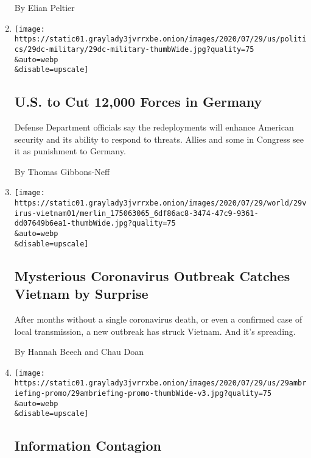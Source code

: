 \begin{enumerate}
  By Elian Peltier
\item
  \href{/2020/07/29/world/europe/us-troops-nato-germany.html}{}

  \texttt{[image: https://static01.graylady3jvrrxbe.onion/images/2020/07/29/us/politics/29dc-military/29dc-military-thumbWide.jpg?quality=75\\\&auto=webp\\\&disable=upscale]}

  \hypertarget{us-to-cut-12000-forces-in-germany}{%
  \subsection{U.S. to Cut 12,000 Forces in
  Germany}\label{us-to-cut-12000-forces-in-germany}}

  Defense Department officials say the redeployments will enhance
  American security and its ability to respond to threats. Allies and
  some in Congress see it as punishment to Germany.

  By Thomas Gibbons-Neff
\item
  \href{/2020/07/29/world/asia/coronavirus-vietnam.html}{}

  \texttt{[image: https://static01.graylady3jvrrxbe.onion/images/2020/07/29/world/29virus-vietnam01/merlin\_175063065\_6df86ac8-3474-47c9-9361-dd07649b6ea1-thumbWide.jpg?quality=75\\\&auto=webp\\\&disable=upscale]}

  \hypertarget{mysterious-coronavirus-outbreak-catches-vietnam-by-surprise}{%
  \subsection{Mysterious Coronavirus Outbreak Catches Vietnam by
  Surprise}\label{mysterious-coronavirus-outbreak-catches-vietnam-by-surprise}}

  After months without a single coronavirus death, or even a confirmed
  case of local transmission, a new outbreak has struck Vietnam. And
  it's spreading.

  By Hannah Beech and Chau Doan
\item
  \href{/2020/07/29/briefing/coronavirus-william-barr-emmy-nominations-your-wednesday-briefing.html}{}

  \texttt{[image: https://static01.graylady3jvrrxbe.onion/images/2020/07/29/us/29ambriefing-promo/29ambriefing-promo-thumbWide-v3.jpg?quality=75\\\&auto=webp\\\&disable=upscale]}

  \hypertarget{information-contagion}{%
  \subsection{Information Contagion}\label{information-contagion}}


\end{enumerate}
